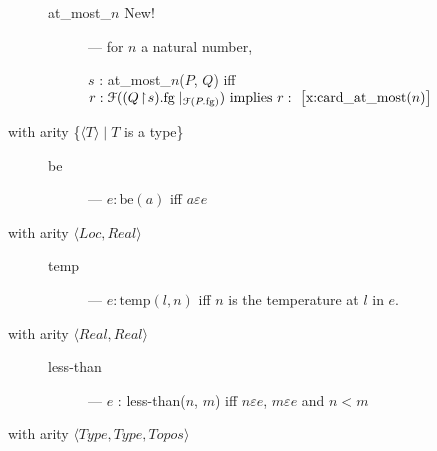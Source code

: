 \begin{description}
\begin{description}
      
    \item[\textnormal{at\_most\_$n$} New!] --- for $n$ a natural
      number,

      $s$ : at\_most\_$n$($P$, $Q$) iff
          $r:\mathcal{F}((Q\!\restriction\!        s).\text{fg}\mid_{\mathcal{F}(P.\text{fg})})
        \text{ implies } r:\text{ \smallrecord{\smalltfield{x}{card\_at\_most($n$)}}}$


\end{description}    

  
\item[with arity \textnormal{\{$\langle T\rangle\mid T$ is a type\}}]
  \mbox{}

  \begin{description}
    
  \item[\textnormal{be}] --- $e:\text{be}(a)$ iff $a\varepsilon e$

  \end{description}

  
\item[with arity
  \textnormal{$\langle\textit{Loc},\textit{Real}\rangle$}] \mbox{}
  \begin{description}
    
  \item[\textnormal{temp}] --- $e:\text{temp}(l,n)$ iff $n$ is
    the temperature at $l$ in $e$.

    
  

  \end{description}
  
\item[with arity
  \textnormal{$\langle\textit{Real},\textit{Real}\rangle$}] \mbox{}

  \begin{description}
    
  \item[\textnormal{less-than}] --- $e$ : less-than($n$, $m$) iff $n\varepsilon e$, $m\varepsilon e$ and $n<m$

  \end{description}

\item[with arity
  \textnormal{$\langle\textit{Type},\textit{Type},\textit{Topos}\rangle$}]
  \mbox{}


\end{description}
